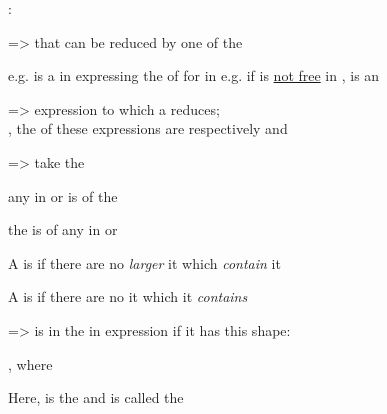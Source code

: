 :
\begin{enumerate}
    \vItem {} =>  that can be reduced by one of the 
    \begin{enumerate}
        \vItem e.g.  is a  in expressing the
         of  for  in 
        \vItem e.g. if  is \ul{not free} in ,  is an 
    \end{enumerate}
    \vItem {} => expression to which a  reduces; \\
    , the  of these expressions are
    respectively  and 

    \vItem {} => take the  
    \begin{enumerate}
        \vItem any  in  or  is 
        of the  

        \vItem the   is  of any
         in  or 

        \vItem A  is  if there are no
        \textit{larger}   it which
        \textit{contain} it

        \vItem A  is  if there are no
          it which it \textit{contains}

        \vItem {}
    \end{enumerate}

    \tcbbreak %

    \vItem {} =>   is in the  in
    expression  if it has this shape:
    \begin{enumerate}
        \vItem {},
        where 
        \begin{itemize}
            \vItem Here, 
            is the  and is called the 
        \end{itemize}


\end{enumerate}
\end{enumerate}
